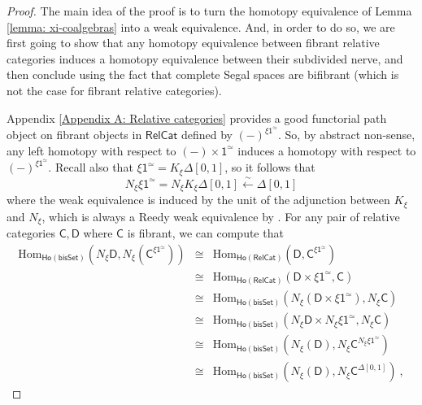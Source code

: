 \documentclass{proc-l}
\newcommand{\ho}[1]{\mathsf{Ho}(#1)}
\theoremstyle{plain}
\theoremstyle{definition}
\theoremstyle{remark}
\begin{document}
\begin{proof}
The main idea of the proof is to turn the homotopy equivalence of Lemma \ref{lemma: xi-coalgebras} into a weak equivalence. And, in order to do so, we are first going to show that any homotopy equivalence between fibrant relative categories induces a homotopy equivalence between their subdivided nerve, and then conclude using the fact that complete Segal spaces are bifibrant (which is not the case for fibrant relative categories).

Appendix \ref{Appendix A: Relative categories} provides a good functorial path object on fibrant objects in $\mathsf{RelCat}$ defined by $(-)^{\xi\mathsf{1}^{\simeq}}$. So, by abstract non-sense, any left homotopy with respect to $(-) \times \mathsf{1}^{\simeq}$ induces a homotopy with respect to $(-)^{\xi\mathsf{1}^{\simeq}}$. Recall also that $\xi\mathsf{1}^{\simeq}=K_{\xi}\Delta[0,1]$, so it follows that
\[
N_{\xi}\xi\mathsf{1}^{\simeq}=N_{\xi}K_{\xi}\Delta[0,1]\stackrel{\sim}{\leftarrow}\Delta[0,1]
\]
where the weak equivalence is induced by the unit of the adjunction between $K_{\xi}$ and $N_{\xi}$, which is always a Reedy weak equivalence by \cite[Proposition 10.3] {BarwickKan1}. For any pair of relative categories $\mathsf{C},\mathsf{D}$ where $\mathsf{C}$ is fibrant, we can compute that
\begin{eqnarray*}
\mathrm{Hom}_{\ho{\mathsf{bisSet}}}(N_{\xi}\mathsf{D},N_{\xi}(\mathsf{C}^{\xi\mathsf{1}^{\simeq}})) & \cong & \mathrm{Hom}_{\ho{\mathsf{RelCat}}}(\mathsf{D},\mathsf{C}^{\xi\mathsf{1}^{\simeq}})  \\
& \cong &\mathrm{Hom}_{\ho{\mathsf{RelCat}}} (\mathsf{D}\times\xi\mathsf{1}^{\simeq},\mathsf{C}) \\
& \cong & \mathrm{Hom}_{\ho{\mathsf{bisSet}}}(N_{\xi}(\mathsf{D}\times\xi\mathsf{1}^{\simeq}),N_{\xi}\mathsf{C}) \\
& \cong & \mathrm{Hom}_{\ho{\mathsf{bisSet}}}(N_{\xi}\mathsf{D}\times N_{\xi}\xi\mathsf{1}^{\simeq},N_{\xi}\mathsf{C}) \\
& \cong & \mathrm{Hom}_{\ho{\mathsf{bisSet}}}(N_{\xi}(\mathsf{D}),N_{\xi}\mathsf{C}^{N_{\xi}\xi\mathsf{1}^{\simeq}}) \\
& \cong & \mathrm{Hom}_{\ho{\mathsf{bisSet}}}(N_{\xi}(\mathsf{D}),N_{\xi}\mathsf{C}^{\Delta[0,1]})~,
\end{eqnarray*}


\end{proof}
\end{document}
